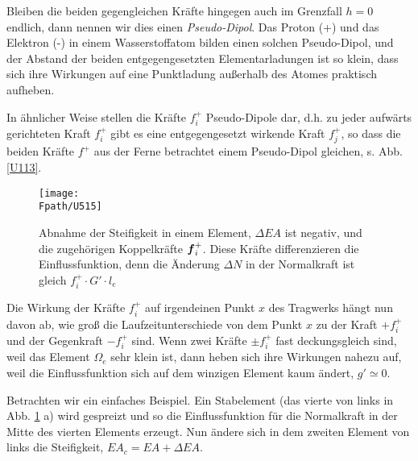 {{Bleiben die beiden gegengleichen Kr\"{a}fte hingegen auch im Grenzfall $h = 0$ endlich, dann nennen wir dies einen {\em Pseudo-Dipol\/}. Das Proton (+) und das Elektron (-) in einem Wasserstoffatom bilden einen solchen Pseudo-Dipol, und der Abstand der beiden entgegengesetzten Elementarladungen ist so klein, dass sich ihre Wirkungen auf eine Punktladung au{\ss}erhalb des Atomes praktisch aufheben.

In \"{a}hnlicher Weise stellen die Kr\"{a}fte $f_i^+$ Pseudo-Dipole dar, d.h. zu jeder aufw\"{a}rts gerichteten Kraft $f_i^+$ gibt es eine entgegengesetzt wirkende Kraft $f_j^+$, so dass die beiden Kr\"{a}fte $f^+$ aus der Ferne betrachtet einem Pseudo-Dipol gleichen, s. Abb. \ref{U113}.
\begin{figure}[tbp]
\centering
\texttt{[image: \\Fpath/U515]}
\caption{Abnahme der Steifigkeit in einem Element, $\Delta EA$ ist negativ,
 und die zugeh\"{o}rigen Koppelkr\"{a}fte $\mbox{\boldmath $f$}_i^+$. Diese Kr\"{a}fte differenzieren die Einflussfunktion, denn die \"{A}nderung $\Delta N$ in der Normalkraft ist gleich $f_i^+ \cdot G' \cdot l_e$}
\label{U515}
\end{figure}%

Die Wirkung der Kr\"{a}fte $f_i^+$ auf irgendeinen Punkt $x$ des Tragwerks h\"{a}ngt nun davon ab, wie gro{\ss} die Laufzeitunterschiede von dem Punkt $x$ zu der Kraft $+f_i^+$ und der Gegenkraft $-f_i^+$ sind. Wenn zwei Kr\"{a}fte $\pm f_i^+$ fast deckungsgleich sind, weil das Element $\Omega_e$ sehr klein ist, dann heben sich ihre Wirkungen nahezu auf, weil die Einflussfunktion sich auf dem winzigen Element kaum \"{a}ndert, $g' \simeq 0$.

Betrachten wir ein einfaches Beispiel. Ein Stabelement (das vierte von links in  Abb. \ref{U515} a) wird gespreizt und so die Einflussfunktion f\"{u}r die Normalkraft in der Mitte des vierten Elements erzeugt. Nun \"{a}ndere sich in dem zweiten Element von links die Steifigkeit, $EA_c = EA + \Delta EA$.

}}
